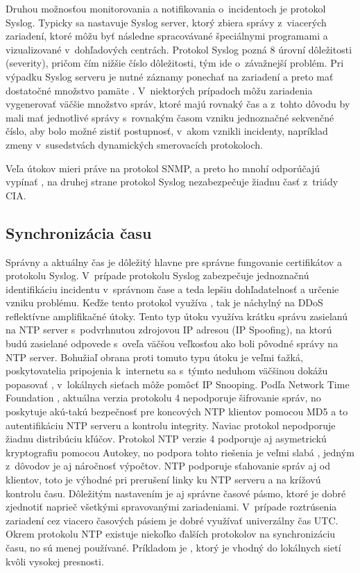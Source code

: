 Druhou možnosťou monitorovania a notifikovania o~incidentoch je protokol Syslog. Typicky sa nastavuje Syslog server, ktorý zbiera správy z~viacerých zariadení, ktoré môžu byť následne spracovávané špeciálnymi programami a vizualizované v~dohľadových centrách. Protokol Syslog pozná 8 úrovní dôležitosti (severity), pričom čím nižšie číslo dôležitosti, tým ide o~závažnejší problém. Pri výpadku Syslog serveru je nutné záznamy ponechať na zariadení a preto mať dostatočné množstvo pamäte \cite{Singh2018} \cite{uYLsMtQInofenpV3}. V~niektorých prípadoch môžu zariadenia vygenerovať väčšie množstvo správ, ktoré majú rovnaký čas a z~tohto dôvodu by mali mať jednotlivé správy s~rovnakým časom vzniku jednoznačné sekvenčné číslo, aby bolo možné zistiť postupnosť, v~akom vznikli incidenty, napríklad zmeny v~susedstvách dynamických smerovacích protokoloch.

Veľa útokov mieri práve na protokol SNMP, a preto ho mnohí odporúčajú vypínať \cite{CIS_DrTLsgXv24lxeIIM}, na druhej strane protokol Syslog nezabezpečuje žiadnu časť z~triády CIA.   


\subsection{Synchronizácia času}
Správny a aktuálny čas je dôležitý hlavne pre správne fungovanie certifikátov a protokolu Syslog. V~prípade protokolu Syslog zabezpečuje jednoznačnú identifikáciu incidentu v~správnom čase a teda lepšiu dohľadatelnosť a určenie vzniku problému. Keďže tento protokol využíva , tak je náchylný na DDoS reflektívne amplifikačné útoky. Tento typ útoku využíva krátku správu zasielanú na NTP server s~podvrhnutou zdrojovou IP adresou (IP Spoofing), na ktorú budú zasielané odpovede s~oveľa väčšou veľkosťou ako boli pôvodné správy na NTP server. Bohužiaľ obrana proti tomuto typu útoku je veľmi ťažká, poskytovatelia pripojenia k~internetu sa s~týmto neduhom väčšinou dokážu popasovať \cite{gTkmbyKon9H6tuAm}, v~lokálnych sieťach môže pomôcť IP Snooping. Podľa Network Time Foundation \cite{s0goWNnWp5OjqREE}, aktuálna verzia protokolu 4 nepodporuje šifrovanie správ, no poskytuje akú-takú bezpečnosť pre koncových NTP klientov pomocou MD5 a to autentifikáciu NTP serveru a kontrolu integrity. Naviac protokol nepodporuje žiadnu distribúciu kľúčov. Protokol NTP verzie 4 podporuje aj asymetrickú kryptografiu pomocou Autokey, no podpora tohto riešenia je veľmi slabá \cite{s0goWNnWp5OjqREE}, jedným z~dôvodov je aj náročnosť výpočtov. NTP podporuje sťahovanie správ aj od klientov, toto je výhodné pri prerušení linky ku NTP serveru a na krížovú kontrolu času. Dôležitým nastavením je aj správne časové pásmo, ktoré je dobré zjednotiť naprieč všetkými spravovanými zariadeniami. V~prípade roztrúsenia zariadení cez viacero časových pásiem je dobré využívať univerzálny čas UTC. Okrem protokolu NTP existuje niekoľko ďalších protokolov na synchronizáciu času, no sú menej používané. Príkladom je , ktorý je vhodný do lokálnych sietí kvôli vysokej presnosti. 

